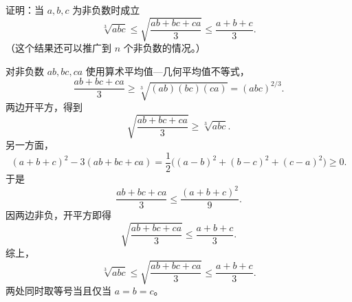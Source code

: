 \begin{xexercise}[4]
证明：当 $a,b,c$ 为非负数时成立
\[
  \sqrt[3]{abc}\le \sqrt{\frac{ab+bc+ca}{3}}\le \frac{a+b+c}{3}.
\]
（这个结果还可以推广到 $n$ 个非负数的情况。）
\end{xexercise}
\begin{xsolution}
对非负数 $ab,bc,ca$ 使用算术平均值—几何平均值不等式，
\[
  \frac{ab+bc+ca}{3}
  \ge\sqrt[3]{(ab)(bc)(ca)}
  =(abc)^{2/3}.
\]
两边开平方，得到
\[
  \sqrt{\frac{ab+bc+ca}{3}}\ge\sqrt[3]{abc}.
\]
另一方面，
\[
  (a+b+c)^2-3(ab+bc+ca)
  =\frac12\bigl((a-b)^2+(b-c)^2+(c-a)^2\bigr)\ge0.
\]
于是
\[
  \frac{ab+bc+ca}{3}\le\frac{(a+b+c)^2}{9}.
\]
因两边非负，开平方即得
\[
  \sqrt{\frac{ab+bc+ca}{3}}\le\frac{a+b+c}{3}.
\]
综上，
\[
  \sqrt[3]{abc}\le\sqrt{\frac{ab+bc+ca}{3}}\le\frac{a+b+c}{3}.
\]
两处同时取等号当且仅当 $a=b=c$。
\end{xsolution}


